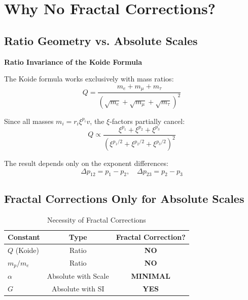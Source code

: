 	\section{Why No Fractal Corrections?}
	
	\subsection{Ratio Geometry vs. Absolute Scales}
	
	\begin{theorem}
		\textbf{Ratio Invariance of the Koide Formula}
		
		The Koide formula works exclusively with mass ratios:
		\begin{equation}
			Q = \frac{m_e + m_\mu + m_\tau}{(\sqrt{m_e} + \sqrt{m_\mu} + \sqrt{m_\tau})^2}
		\end{equation}
		
		Since all masses $m_i = r_i \xi^{p_i} v$, the $\xi$-factors partially cancel:
		\begin{equation}
			Q \propto \frac{\xi^{p_1} + \xi^{p_2} + \xi^{p_3}}{(\xi^{p_1/2} + \xi^{p_2/2} + \xi^{p_3/2})^2}
		\end{equation}
		
		The result depends only on the exponent differences:
		\begin{equation}
			\Delta p_{12} = p_1 - p_2, \quad \Delta p_{23} = p_2 - p_3
		\end{equation}
	\end{theorem}
	
	\subsection{Fractal Corrections Only for Absolute Scales}
	
	\begin{table}[h]
		\centering
		\begin{tabular}{lcc}
			\toprule
			\textbf{Constant} & \textbf{Type} & \textbf{Fractal Correction?} \\
			\midrule
			$Q$ (Koide) & Ratio & \textbf{NO} \\
			$m_p/m_e$ & Ratio & \textbf{NO} \\
			$\alpha$ & Absolute with Scale & \textbf{MINIMAL} \\
			$G$ & Absolute with SI & \textbf{YES} \\
			\bottomrule
		\end{tabular}
		\caption{Necessity of Fractal Corrections}
	\end{table}
	
